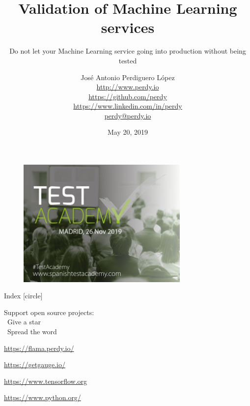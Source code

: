 \documentclass[final, 9pt, svgnames, xcolor=table]{beamerPerdy}
\title{Validation of Machine Learning services}
\subtitle{Do not let your Machine Learning service going into production without being tested}
\author[J. A. Perdiguero López]{
José Antonio Perdiguero López\\
\href{http://www.perdy.io}{\scriptsize{\faGlobe\; http://www.perdy.io}}\\
\href{https://github.com/perdy}{\scriptsize{\faGithub\; https://github.com/perdy}}\\
\href{https://www.linkedin.com/in/perdy}{\scriptsize{\faLinkedin\; https://www.linkedin.com/in/perdy}}\\
\href{mailto://perdy@perdy.io}{\scriptsize{\faAt\; perdy@perdy.io}}}
\institute[Piksel]{Software Architect @ Piksel}
\date{May 20, 2019}
\begin{document}
\begin{frame}
    \begin{figure}
        \centering
        \includegraphics[width=0.75\textwidth]{img/portada_4.3.jpeg}
    \end{figure}
\end{frame}

\begin{frame}
    \titlepage
\end{frame}

\begin{frame}{Index}
    [circle]
    \tableofcontents
\end{frame}






\begin{frame}[standout]
    \Huge{Support open source projects: \\ \faStar \, Give a star\\ \faBullhorn \, Spread the word}

    \qquad

    \href{https://flama.perdy.io}{https://flama.perdy.io/}

    \href{https://getgauge.io/}{https://getgauge.io/}

    \href{https://www.tensorflow.org/}{https://www.tensorflow.org}

    \href{https://www.python.org/}{https://www.python.org/}
\end{frame}
\end{document}
